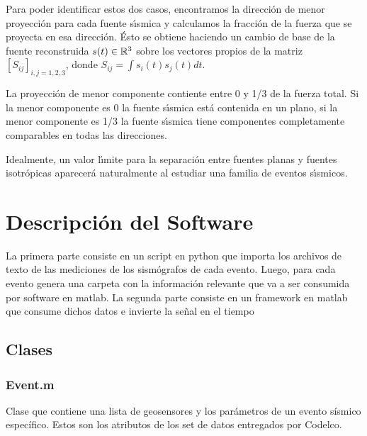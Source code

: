 Para poder identificar estos dos casos, encontramos la direcci\'on de
menor proyecci\'on para cada fuente s\'{\i}smica y
calculamos la fracci\'on de la fuerza que se proyecta en esa direcci\'on.
\'Esto se obtiene haciendo un cambio de base de la
fuente reconstruida $s(t)\in \mathbb{R}^3$ sobre los vectores propios de la
matriz $[S_{ij}]_{i,j=1,2,3}$, donde $S_{ij}=\int s_i(t)s_j(t) dt$.

La proyecci\'on de menor componente contiente
entre 0 y 1/3 de la fuerza total. Si la menor componente
es 0 la fuente s\'{\i}smica est\'a contenida en un plano, si la menor componente es 1/3
 la fuente s\'{\i}smica
tiene componentes completamente comparables en todas las direcciones.

Idealmente, un valor l\'{\i}mite para la separaci\'on entre fuentes planas y fuentes isotr\'opicas
aparecer\'a naturalmente al estudiar una familia de eventos s\'{\i}smicos.

\section{Descripci\'on del Software}

La primera parte consiste en un script en python que importa los archivos de
texto de las mediciones de los sism\'ografos de cada evento. Luego, para cada
evento genera una carpeta con la información relevante que va a ser consumida
por software en matlab.
La segunda parte consiste en un framework en matlab que consume dichos datos e
invierte la señal en el tiempo

\subsection{Clases}

\subsubsection{Event.m} 
Clase que contiene una lista de geosensores y los parámetros de un evento
sísmico específico. Estos son los atributos de los set de datos entregados
por Codelco.
